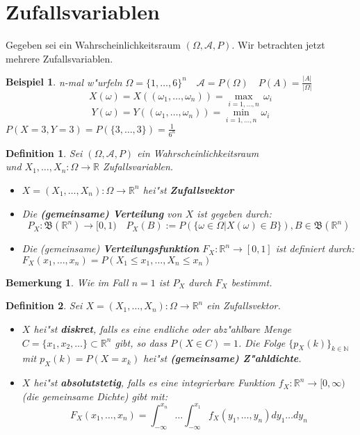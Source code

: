 \documentclass[a4paper,11pt]{book}
\newcommand{\R}{{\mathbb R}}
\newcommand{\N}{{\mathbb N}}
\def\AA{ \mathcal{A} }
\def\BB{ \mathfrak{B} }
\newtheorem{Def}{Definition}[chapter]
\newtheorem{Bsp}{Beispiel}[chapter]
\newtheorem{Bem}{Bemerkung}[chapter]
\theoremstyle{nonumberplain}
\begin{document}
\section{Zufallsvariablen}
Gegeben sei ein Wahrscheinlichkeitsraum $(\Omega,\AA,P)$. Wir betrachten jetzt mehrere Zufallsvariablen.

\begin{Bsp}
n-mal w"urfeln $\Omega=\{1,\ldots,6\}^n \quad \AA=P(\Omega) \quad P(A)=\frac{|A|}{|\Omega|}$
\[X(\omega)=X((\omega_1,\ldots,\omega_n))= \max_{i=1,\ldots,n}\, \omega_i\]
\[Y(\omega)=Y((\omega_1,\ldots,\omega_n))= \min_{i=1,\ldots,n}\, \omega_i\]
$P(X=3,Y=3)=P(\{3,\ldots,3\})=\frac{1}{6^n}$
\end{Bsp}

\begin{Def}
Sei $(\Omega,\AA,P)$ ein Wahrscheinlichkeitsraum \\
und $X_1,\ldots,X_n : \Omega\rightarrow \R$ Zufallsvariablen.
\begin{itemize}
\item [a)] $X=(X_1,\ldots,X_n) : \Omega\rightarrow \R^n$ hei"st \textbf{Zufallsvektor}
\item [b)] Die \textbf{(gemeinsame) Verteilung} von $X$ ist gegeben durch:
\[P_X:\BB(\R^n)\rightarrow [0,1) \quad P_X(B):=P(\{\omega\in\Omega | X(\omega)\in B\}),B\in\BB(\R^n)\]  
\item [c)] Die (gemeinsame) \textbf{Verteilungsfunktion} $F_X:\R^n\rightarrow [0,1]$ ist definiert durch:\\
$F_X(x_1,\ldots,x_n)=P(X_1\leq x_1,\ldots, X_n\leq x_n)$
\end{itemize}
\end{Def}

\begin{Bem}
Wie im Fall $n=1$ ist $P_X$ durch $F_X$ bestimmt.
\end{Bem}

\begin{Def}
Sei $X=(X_1,\ldots,X_n):\Omega\rightarrow \R^n$ ein Zufallsvektor.
\begin{itemize}
\item [a)] $X$ hei"st \textbf{diskret}, falls es eine endliche oder abz"ahlbare Menge $C=\{x_1,x_2,\ldots\}\subset \R^n$ gibt, so dass $P(X\in C)=1$. Die Folge $\{p_X(k)\}_{k\in\N}$ mit $p_X(k)=P(X=x_k)$ hei"st \textbf{(gemeinsame) Z"ahldichte}.
\item [b)] $X$ hei"st \textbf{absolutstetig}, falls es eine integrierbare Funktion $f_X:\R^n\rightarrow [0,\infty)$ (die gemeinsame Dichte) gibt mit:
\[F_X(x_1,\ldots,x_n)=\int_{-\infty}^{x_n}\ldots \int_{-\infty}^{x_1}f_X(y_1,\ldots ,y_n)dy_1\ldots dy_n\]
\end{itemize}
\end{Def}
\end{document}
